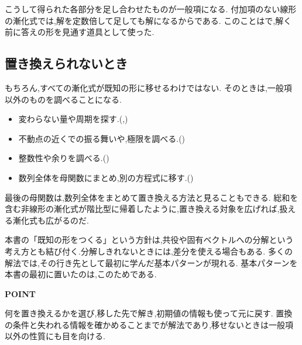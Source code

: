 こうして得られた各部分を足し合わせたものが一般項になる.
付加項のない線形の漸化式では,解を定数倍して足しても解になるからである.
このことはで,解く前に答えの形を見通す道具として使った.

\subsection{置き換えられないとき}\label{節：置き換えられないとき}

もちろん,すべての漸化式が既知の形に移せるわけではない.
そのときは,一般項以外のものを調べることになる.
\begin{itemize}
  \item 変わらない量や周期を探す.(,)
  \item 不動点の近くでの振る舞いや,極限を調べる.()
  \item 整数性や余りを調べる.()
  \item 数列全体を母関数にまとめ,別の方程式に移す.()
\end{itemize}
最後の母関数は,数列全体をまとめて置き換える方法と見ることもできる.
総和を含む非線形の漸化式が階比型に帰着したように,置き換える対象を広げれば,扱える漸化式も広がるのだ.

本書の「既知の形をつくる」という方針は,共役や固有ベクトルへの分解という考え方とも結び付く.分解しきれないときには,差分を使える場合もある.
多くの解法では,その行き先として最初に学んだ基本パターンが現れる.
基本パターンを本書の最初に置いたのは,このためである.

\begin{bookpoint}
  \textbf{POINT}\par
  何を置き換えるかを選び,移した先で解き,初期値の情報も使って元に戻す.
  置換の条件と失われる情報を確かめることまでが解法であり,移せないときは一般項以外の性質にも目を向ける.
\end{bookpoint}
